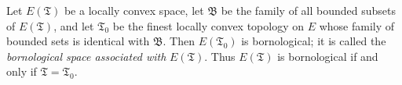 Let $E(\mathfrak{T})$ be a locally convex space, let $\mathfrak{B}$ be the family of all bounded subsets of $E(\mathfrak{T})$, and let $\mathfrak{T}_0$ be the finest locally convex topology on $E$ whose family of bounded sets is identical with $\mathfrak{B}$. Then $E(\mathfrak{T}_0)$ is bornological; it is called the \textit{bornological space associated with} $E(\mathfrak{T})$. Thus $E(\mathfrak{T})$ is bornological if and only if $\mathfrak{T} = \mathfrak{T}_0$.
